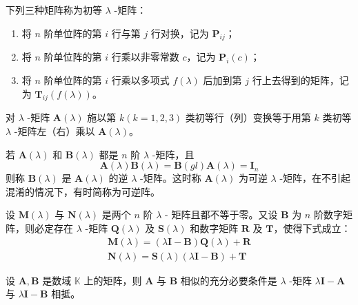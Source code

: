 \begin{definition}
    下列三种矩阵称为初等 $\lambda$ -矩阵：
    \begin{enumerate}
        \item 将 $n$ 阶单位阵的第 $i$ 行与第 $j$ 行对换，记为 $\bm{P}_{ij}$；
        \item 将 $n$ 阶单位阵的第 $i$ 行乘以非零常数 $c$，记为 $\bm{P}_{i}(c)$；
        \item 将 $n$ 阶单位阵的第 $i$ 行乘以多项式 $f(\lambda)$ 后加到第 $j$ 行上去得到的矩阵，记为 $\bm{T}_{ij}(f(\lambda))$。
    \end{enumerate}
\end{definition}

\begin{theorem}
    对 $\lambda$ -矩阵 $\bm{A}(\lambda)$ 施以第 $k(k = 1, 2, 3)$ 类初等行（列）变换等于用第 $k$ 类初等 $\lambda$ -矩阵左（右）乘以 $\bm{A}(\lambda)$。
\end{theorem}

\begin{definition}
    若 $\bm{A}(\lambda)$ 和 $\bm{B}(\lambda)$ 都是 $n$ 阶 $\lambda$ -矩阵，且
    \[
        \bm{A}(\lambda)\bm{B}(\lambda) = \bm{B}(gl)\bm{A}(\lambda) = \bm{I}_{n}
    \]
    则称 $\bm{B}(\lambda)$ 是 $\bm{A}(\lambda)$ 的逆 $\lambda$ -矩阵。这时称 $\bm{A}(\lambda)$ 为可逆 $\lambda$ -矩阵，在不引起混淆的情况下，有时简称为可逆阵。
\end{definition}

\begin{lemma}
    设 $\bm{M}(\lambda)$ 与 $\bm{N}(\lambda)$ 是两个 $n$ 阶 $\lambda$ - 矩阵且都不等于零。又设 $\bm{B}$ 为 $n$ 阶数字矩阵，则必定存在 $\lambda$ -矩阵 $\bm{Q}(\lambda)$ 及 $\bm{S}(\lambda)$ 和数字矩阵 $\bm{R}$ 及 $\bm{T}$，使得下式成立：
    \begin{align*}
        \bm{M}(\lambda) = (\lambda \bm{I} - \bm{B})\bm{Q}(\lambda) + \bm{R} \\
        \bm{N}(\lambda) = \bm{S}(\lambda)(\lambda \bm{I} - \bm{B}) + \bm{T}
    \end{align*}
\end{lemma}

\begin{theorem}
    设 $\bm{A}, \bm{B}$ 是数域 $\mathbb{K}$ 上的矩阵，则 $\bm{A}$ 与 $\bm{B}$ 相似的充分必要条件是 $\lambda$ -矩阵 $\lambda \bm{I} - \bm{A}$ 与 $\lambda \bm{I} - \bm{B}$ 相抵。
\end{theorem}




